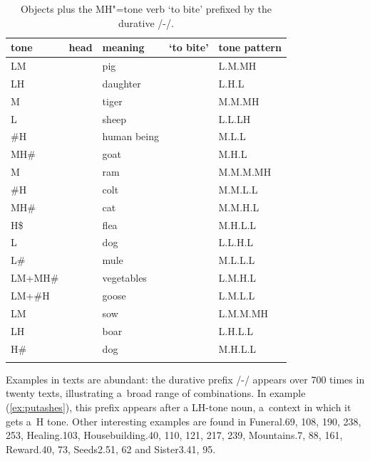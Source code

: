 \begin{table}%
\caption{\label{tab:objectsplusmhtoneverbsprefixedbythedurative}Objects plus the MH"=tone verb  ‘to bite’ prefixed by the {durative} /-/.}
\begin{tabularx}{\textwidth}{ l l l@{\hspace{6mm}} Q l }
\lsptoprule
	tone & head & meaning &  ‘to bite’ & tone pattern\\ \midrule
	LM &  & pig &  & L.M.MH\\
	LH &  & daughter &  & L.H.L\\
	M &  & tiger &  & M.M.MH\\
	L &  & sheep & \shadedcell {} & \shadedcell L.L.LH\\
	\#H &  & human being &  & M.L.L\\
	MH\# &  & goat &  & M.H.L\\ \addlinespace \hdashline \addlinespace
	M &  & ram &  & M.M.M.MH\\
	\#H &  & colt &  & M.M.L.L\\
	MH\# &  & cat &  & M.M.H.L\\
	H\$ &  & flea &  & M.H.L.L\\
	L &  & dog &  & L.L.H.L\\
	L\# &  & mule &  & M.L.L.L\\
	LM+MH\# &  & vegetables &  & L.M.H.L\\
	LM+\#H &  & goose &  & L.M.L.L\\
	LM &  & sow &  & L.M.M.MH\\
	LH &  & boar &  & L.H.L.L\\
	H\# &  & dog &  & M.H.L.L\\
\lspbottomrule
\end{tabularx}
\end{table}



Examples in texts are abundant: the {durative} prefix /-/ appears over 700 times in twenty
texts, illustrating a~broad range of combinations. In example (\ref{ex:putashes}), this prefix appears after a LH-tone noun, a~context in which it gets a~H tone. Other interesting examples are found in Funeral.69,
108, 190, 238, 253, Healing.103, Housebuilding.40, 110, 121, 217, 239, Mountains.7, 88, 161,
Reward.40, 73, Seeds2.51, 62 and Sister3.41, 95.

